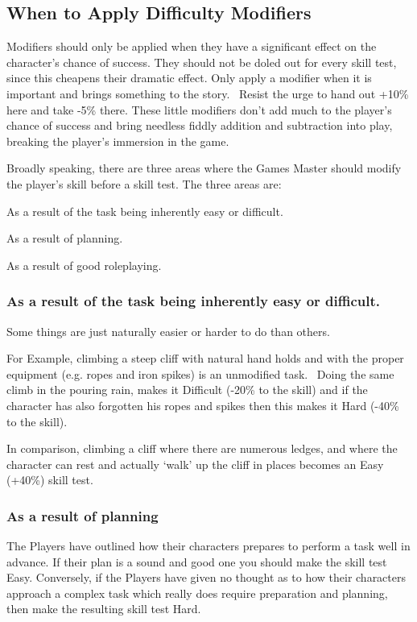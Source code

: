 \subsection{When to Apply Difficulty Modifiers}
\label{ssec:when-to-apply-difficulty-modifies}
Modifiers should only be applied when they have a significant effect on the character’s chance of success. They should not be doled out for every skill test, since this cheapens their dramatic effect. Only apply a modifier when it is important and brings something to the story.  Resist the urge to hand out +10\% here and take -5\% there. These little modifiers don’t add much to the player’s chance of success and bring needless fiddly addition and subtraction into play, breaking the player’s immersion in the game.

Broadly speaking, there are three areas where the Games Master should modify the player’s skill before a skill test. The three areas are:

\begin{rpg-list}
	\item As a result of the task being inherently easy or difficult.\\
	\item As a result of planning.\\
	\item As a result of good roleplaying.
\end{rpg-list}


\subsubsection{As a result of the task being inherently easy or difficult.}
Some things are just naturally easier or harder to do than others. 

For Example, climbing a steep cliff with natural hand holds and with the proper equipment (e.g. ropes and iron spikes) is an unmodified task.  Doing the same climb in the pouring rain, makes it Difficult (-20\% to the skill) and if the character has also forgotten his ropes and spikes then this makes it Hard (-40\% to the skill).

In comparison, climbing a cliff where there are numerous ledges, and where the character can rest and actually ‘walk’ up the cliff in places becomes an Easy (+40\%) skill test.


\subsubsection{As a result of planning}
The Players have outlined how their characters prepares to perform a task well in advance. If their plan is a sound and good one you should make the skill test Easy. Conversely, if the Players have given no thought as to how their characters approach a complex task which really does require preparation and planning, then make the resulting skill test Hard.

